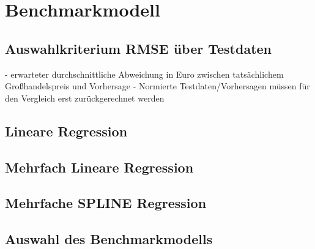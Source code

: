 \section{Benchmarkmodell}

\subsection{Auswahlkriterium RMSE über Testdaten}
- erwarteter durchschnittliche Abweichung in Euro zwischen tatsächlichem Großhandelspreis und Vorhersage 
- Normierte Testdaten/Vorhersagen müssen für den Vergleich erst zurückgerechnet werden

\subsection{Lineare Regression}

\subsection{Mehrfach Lineare Regression}

\subsection{Mehrfache SPLINE Regression}

\subsection{Auswahl des Benchmarkmodells}
